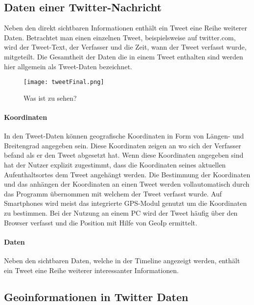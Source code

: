 			\subsection{Daten einer Twitter-Nachricht}
				Neben den direkt sichtbaren Informationen enthält ein Tweet eine Reihe weiterer Daten.
				Betrachtet man einen einzelnen Tweet, beispielsweise auf twitter.com, wird der Tweet-Text, der Verfasser und die Zeit, wann der Tweet verfasst wurde, mitgeteilt.  
				Die Gesamtheit der Daten die in einem Tweet enthalten sind werden hier allgemein als Tweet-Daten bezeichnet.

				\begin{figure}[h!]
				\begin{center}
				\texttt{[image: tweetFinal.png]}
				\caption{Was ist zu sehen?}
				\label{tweet}
				\end{center}
				\end{figure}	


				\paragraph{Koordinaten}
					In den Tweet-Daten können geografische Koordinaten in Form von Längen- und Breitengrad angegeben sein. 
					Diese Koordinaten zeigen an wo sich der Verfasser befand als er den Tweet abgesetzt hat.
					Wenn diese Koordinaten angegeben sind hat der Nutzer explizit zugestimmt, dass die Koordinaten seines aktuellen Aufenthaltsortes dem Tweet angehängt werden. 
					Die Bestimmung der Koordinaten und das anhängen der Koordinaten an einen Tweet werden vollautomatisch durch das Programm übernommen mit welchem der Tweet verfasst wurde.
					Auf Smartphones wird meist das integrierte GPS-Modul genutzt um die Koordinaten zu bestimmen. 
					Bei der Nutzung an einem PC wird der Tweet häufig über den Browser verfasst und die Position mit Hilfe von GeoIp ermittelt.


			 	\paragraph{Daten}
			 		Neben den sichtbaren Daten, welche in der Timeline angezeigt werden, enthält ein Tweet eine Reihe weiterer interessanter Informationen. 	


			

		 	\subsection{Geoinformationen in Twitter Daten}
